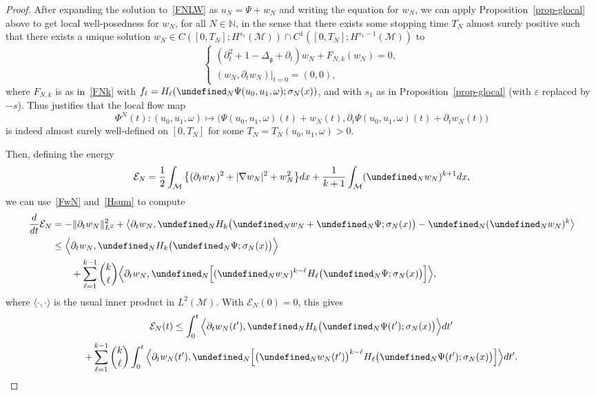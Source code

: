 \documentclass[AHL,Unicode,longabstracts,published]{cedram}
\newcommand{\N}{\mathbb{N}}
\let\P= \undefined
\newcommand{\P}{\mathbf{P}}
\newcommand{\En}{\mathcal{E}}
\newcommand{\M}{\mathcal{M}}
\newcommand{\g}{\mathfrak{g}}
\newcommand{\Dlg}{\Delta_{\g}}
\newcommand{\eps}{\varepsilon}
\newcommand{\s}{\sigma}
\newcommand{\dt}{\partial_t}
\renewcommand{\o}{\omega}
\begin{document}
\begin{proof}
After expanding the solution to~\eqref{FNLW} as $u_N = \Psi + w_N$ and writing the equation for $w_N$, we can apply Proposition~\ref{prop-glocal} above to get local well-posedness for $w_N$, for all $N\in\N$, in the sense that there exists some stopping time $T_N$ almost surely positive such that there exists a unique solution $w_N\in C([0,T_N];H^{s_1}(\M))\cap C^1([0,T_N];H^{s_1-1}(\M))$ to
\begin{equation}\label{FwN}
\begin{cases}
\left(\dt^2+1-\Dlg+\dt\right)w_N + F_{N,k}(w_N)=0,\\
(w_N,\dt w_N)|_{t=0}=(0,0),
\end{cases}
\end{equation}
where $F_{N,k}$ is as in~\eqref{FNk} with $f_{\ell}=H_{\ell}(\P_N\Psi(u_0,u_1,\o);\s_N(x))$, and with $s_1$ as in Proposition~\ref{prop-glocal} (with $\eps$ replaced by $-s$). Thus justifies that the local flow map
\begin{equation*}
\Phi^N(t) : (u_0,u_1,\o) \mapsto \big(\Psi(u_0,u_1,\o)(t) + w_N(t),\dt\Psi(u_0,u_1,\o)(t) + \dt w_N(t)\big)
\end{equation*}
is indeed almost surely well-defined on $[0,T_N]$ for some $T_N=T_N(u_0,u_1,\o)>0$.

Then, defining the energy
\begin{equation*}
\En_N=\frac12\int_{\M}\big\{(\dt w_N)^2 + |\nabla w_N|^2 + w_N^2\big\}dx + \frac{1}{k+1}\int_{\M}(\P_Nw_N)^{k+1}dx,
\end{equation*}
we can use~\eqref{FwN} and~\eqref{Hsum} to compute
\begin{align*}
\frac{d}{dt}\En_N &= -\|\dt w_N\|_{L^2}^2 +\big\langle \dt w_N, \P_NH_k\big(\P_Nw_N+\P_N\Psi;\s_N(x)\big)-\P_N(\P_Nw_N)^k\big\rangle\\
&\le\Big\langle \dt w_N, \P_NH_k\big(\P_N\Psi;\s_N(x)\big)\Big\rangle\\
&\qquad+\sum_{\ell=1}^{k-1}{\binom k \ell}\Big\langle \dt w_N,\P_N\Big[(\P_Nw_N)^{k-\ell}H_{\ell}\big(\P_N\Psi;\s_N(x)\big)\Big]\Big\rangle,
\end{align*}
where $\langle \cdot,\cdot\rangle$ is the usual inner product in $L^2(\M)$. With $\En_N(0)=0$, this gives
\begin{multline}\label{En}
\En_N(t) \le \int_0^t\Big\langle \dt w_N(t'), \P_NH_k\big(\P_N\Psi(t');\s_N(x)\big)\Big\rangle dt'\\
+\sum_{\ell=1}^{k-1}{\binom k \ell}\int_0^t\Big\langle \dt w_N(t'),\P_N\Big[\big(\P_Nw_N(t')\big)^{k-\ell}H_{\ell}\big(\P_N\Psi(t');\s_N(x)\big)\Big]\Big\rangle dt'.
\end{multline}


\end{proof}
\end{document}
